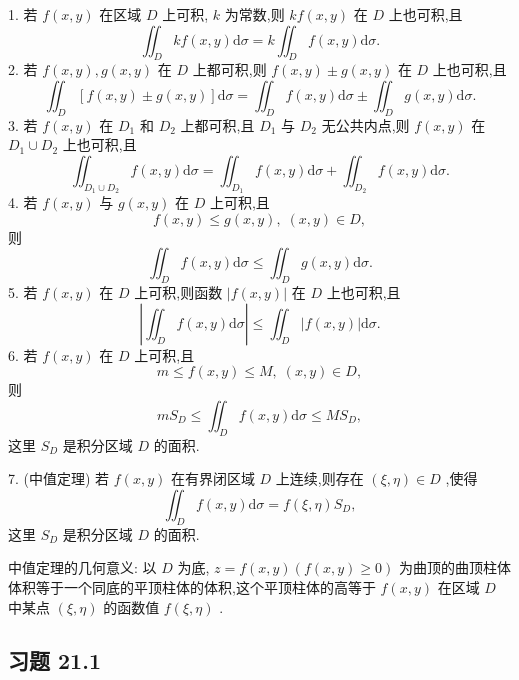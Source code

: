 1. 若 \(f\left( {x,y}\right)\) 在区域 \(D\) 上可积, \(k\) 为常数,则 \({kf}\left( {x,y}\right)\) 在 \(D\) 上也可积,且
\[
{\iint }_{D}{kf}\left( {x,y}\right) \mathrm{d}\sigma  = k{\iint }_{D}f\left( {x,y}\right) \mathrm{d}\sigma .
\]
2. 若 \(f\left( {x,y}\right) ,g\left( {x,y}\right)\) 在 \(D\) 上都可积,则 \(f\left( {x,y}\right)  \pm  g\left( {x,y}\right)\) 在 \(D\) 上也可积,且
\[
{\iint }_{D}\left\lbrack  {f\left( {x,y}\right)  \pm  g\left( {x,y}\right) }\right\rbrack  \mathrm{d}\sigma  = {\iint }_{D}f\left( {x,y}\right) \mathrm{d}\sigma  \pm  {\iint }_{D}g\left( {x,y}\right) \mathrm{d}\sigma .
\]
3. 若 \(f\left( {x,y}\right)\) 在 \({D}_{1}\) 和 \({D}_{2}\) 上都可积,且 \({D}_{1}\) 与 \({D}_{2}\) 无公共内点,则 \(f\left( {x,y}\right)\) 在 \({D}_{1} \cup  {D}_{2}\) 上也可积,且
\[
{\iint }_{{D}_{1} \cup  {D}_{2}}f\left( {x,y}\right) \mathrm{d}\sigma  = {\iint }_{{D}_{1}}f\left( {x,y}\right) \mathrm{d}\sigma  + {\iint }_{{D}_{2}}f\left( {x,y}\right) \mathrm{d}\sigma .
\]
4. 若 \(f\left( {x,y}\right)\) 与 \(g\left( {x,y}\right)\) 在 \(D\) 上可积,且
\[
f\left( {x,y}\right)  \leq  g\left( {x,y}\right) ,\;\left( {x,y}\right)  \in  D,
\]
则
\[
{\iint }_{D}f\left( {x,y}\right) \mathrm{d}\sigma  \leq  {\iint }_{D}g\left( {x,y}\right) \mathrm{d}\sigma .
\]
5. 若 \(f\left( {x,y}\right)\) 在 \(D\) 上可积,则函数 \(\left| {f\left( {x,y}\right) }\right|\) 在 \(D\) 上也可积,且
\[
\left| {{\iint }_{D}f\left( {x,y}\right) \mathrm{d}\sigma }\right|  \leq  {\iint }_{D}\left| {f\left( {x,y}\right) }\right| \mathrm{d}\sigma .
\]
6. 若 \(f\left( {x,y}\right)\) 在 \(D\) 上可积,且
\[
m \leq  f\left( {x,y}\right)  \leq  M,\;\left( {x,y}\right)  \in  D,
\]
则
\[
m{S}_{D} \leq  {\iint }_{D}f\left( {x,y}\right) \mathrm{d}\sigma  \leq  M{S}_{D},
\]
这里 \({S}_{D}\) 是积分区域 \(D\) 的面积.

7. (中值定理) 若 \(f\left( {x,y}\right)\) 在有界闭区域 \(D\) 上连续,则存在 \(\left( {\xi ,\eta }\right)  \in  D\) ,使得
\[
{\iint }_{D}f\left( {x,y}\right) \mathrm{d}\sigma  = f\left( {\xi ,\eta }\right) {S}_{D},
\]
这里 \({S}_{D}\) 是积分区域 \(D\) 的面积.

中值定理的几何意义: 以 \(D\) 为底, \(z = f\left( {x,y}\right) \left( {f\left( {x,y}\right)  \geq  0}\right)\) 为曲顶的曲顶柱体体积等于一个同底的平顶柱体的体积,这个平顶柱体的高等于 \(f\left( {x,y}\right)\) 在区域 \(D\) 中某点 \(\left( {\xi ,\eta }\right)\) 的函数值 \(f\left( {\xi ,\eta }\right)\) .

\subsection{习题 21.1}


